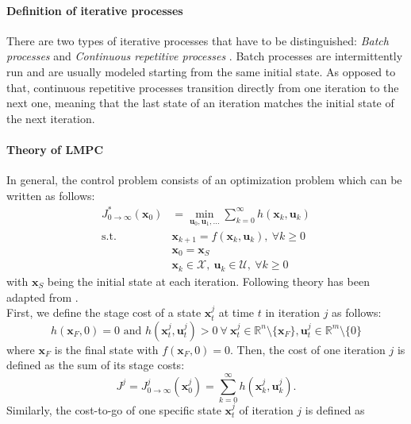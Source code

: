 \paragraph{Definition of iterative processes}
There are two types of iterative processes that have to be distinguished: \emph{Batch processes} and \emph{Continuous repetitive processes} \cite{Wang2009}. Batch processes are intermittently run and are usually modeled starting from the same initial state. As opposed to that, continuous repetitive processes transition directly from one iteration to the next one, meaning that the last state of an iteration matches the initial state of the next iteration.
\paragraph{Theory of LMPC}
In general, the control problem consists of an optimization problem which can be written as follows:
\begin{subequations}\label{eq:generalProblem}
\begin{align}
J_{0\rightarrow \infty}^*(\bm{x}_0)&=\min_{\bm{u}_0,\bm{u}_1,\ldots} \sum\limits_{k=0}^{\infty} h(\bm{x}_k,\bm{u}_k)\\
\textrm{s.t. }
&\bm{x}_{k+1}=f(\bm{x}_k,\bm{u}_k),~\forall k\geq 0 \\
&\bm{x}_0 = \bm{x}_S \label{eq:generalProblem3}\\
&\bm{x}_k \in \mathcal{X},~\bm{u}_k \in \mathcal{U},~\forall k\geq 0
\end{align}
\end{subequations}
with $\bm{x}_S$ being the initial state at each iteration.
Following theory has been adapted from \cite{Rosolia2016}.\\
First, we define the stage cost of a state $\bm{x}_t^j$ at time $t$ in iteration $j$ as follows:
\begin{equation}\label{eq:iterationCost}
h(\bm{x}_F,0)=0\text{ and } h(\bm{x}_t^j,\bm{u}_t^j)>0\ \forall\ \bm{x}_t^j\in\mathbb{R}^n\setminus \{\bm{x}_F\},\bm{u}_t^j\in\mathbb{R}^m\setminus\{0\}
\end{equation}
where $\bm{x}_F$ is the final state with $f(\bm{x}_F,0)=0$.
Then, the cost of one iteration $j$ is defined as the sum of its stage costs:
\begin{equation}
J^j = J_{0\rightarrow\infty}^j(\bm{x}_0^j)=\sum_{k=0}^\infty h(\bm{x}_k^j,\bm{u}_k^j).
\end{equation}
Similarly, the cost-to-go of one specific state $\bm{x}_t^j$ of iteration $j$ is defined as
